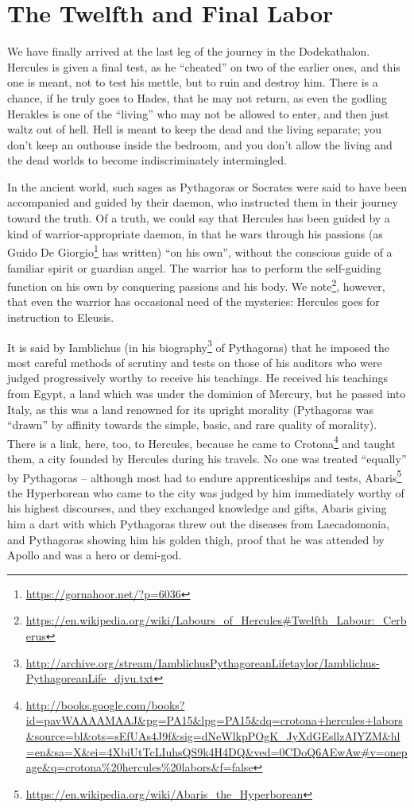 \section{The Twelfth and Final Labor}

We have finally arrived at the last leg of the journey in the Dodekathalon. Hercules is given a final test, as he ``cheated'' on two of the earlier ones, and this one is meant, not to test his mettle, but to ruin and destroy him. There is a chance, if he truly goes to Hades, that he may not return, as even the godling Herakles is one of the ``living'' who may not be allowed to enter, and then just waltz out of hell. Hell is meant to keep the dead and the living separate; you don't keep an outhouse inside the bedroom, and you don't allow the living and the dead worlds to become indiscriminately intermingled.

In the ancient world, such sages as Pythagoras or Socrates were said to have been accompanied and guided by their daemon, who instructed them in their journey toward the truth. Of a truth, we could say that Hercules has been guided by a kind of warrior-appropriate daemon, in that he wars through his passions (as Guido De Giorgio\footnote{\url{https://gornahoor.net/?p=6036}} has written) ``on his own'', without the conscious guide of a familiar spirit or guardian angel. The warrior has to perform the self-guiding function on his own by conquering passions and his body. We note\footnote{\url{https://en.wikipedia.org/wiki/Labours\_of\_Hercules\#Twelfth\_Labour:\_Cerberus}}, however, that even the warrior has occasional need of the mysteries: Hercules goes for instruction to Eleusis.

It is said by Iamblichus (in his biography\footnote{\url{http://archive.org/stream/IamblichusPythagoreanLifetaylor/Iamblichus-PythagoreanLife\_djvu.txt}} of Pythagoras) that he imposed the most careful methods of scrutiny and tests on those of his auditors who were judged progressively worthy to receive his teachings. He received his teachings from Egypt, a land which was under the dominion of Mercury, but he passed into Italy, as this was a land renowned for its upright morality (Pythagoras was ``drawn'' by affinity towards the simple, basic, and rare quality of morality). There is a link, here, too, to Hercules, because he came to Crotona\footnote{\url{http://books.google.com/books?id=pavWAAAAMAAJ&pg=PA15&lpg=PA15&dq=crotona+hercules+labors&source=bl&ots=sEfUAs4J9f&sig=dNeWlkpPOgK\_JyXdGEsllzAIYZM&hl=en&sa=X&ei=4XbiUtTcLIuhsQS9k4H4DQ&ved=0CDoQ6AEwAw\#v=onepage&q=crotona\%20hercules\%20labors&f=false}} and taught them, a city founded by Hercules during his travels. No one was treated ``equally'' by Pythagoras -- although most had to endure apprenticeships and tests, Abaris\footnote{\url{https://en.wikipedia.org/wiki/Abaris\_the\_Hyperborean}} the Hyperborean who came to the city was judged by him immediately worthy of his highest discourses, and they exchanged knowledge and gifts, Abaris giving him a dart with which Pythagoras threw out the diseases from Laecadomonia, and Pythagoras showing him his golden thigh, proof that he was attended by Apollo and was a hero or demi-god.


